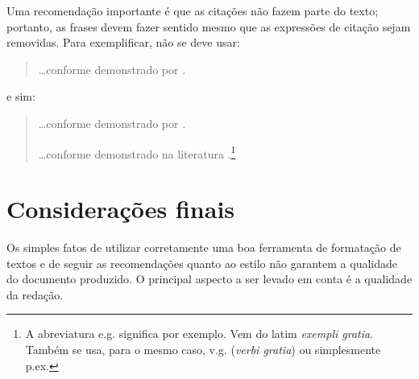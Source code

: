 Uma recomendação importante é que as citações não fazem parte do
texto; portanto, as frases devem fazer sentido mesmo que as expressões
de citação sejam removidas. Para exemplificar, não se deve usar:
\begin{quotation}
\dots conforme demonstrado por \cite{art-solimaes03}.
\end{quotation}
e sim:
\begin{quotation}
\dots conforme demonstrado por .

\dots conforme demonstrado na literatura
.\footnote{A abreviatura e.g.
significa por exemplo. Vem do latim \emph{exempli gratia}. Também se
usa, para o mesmo caso, v.g. (\emph{verbi gratia}) ou simplesmente
p.ex.}
\end{quotation}

\section{Considerações finais}

Os simples fatos de utilizar corretamente uma boa ferramenta de
formatação de textos e de seguir as recomendações quanto ao estilo
não garantem a qualidade do documento produzido. O principal
aspecto a ser levado em conta é a qualidade da redação.

